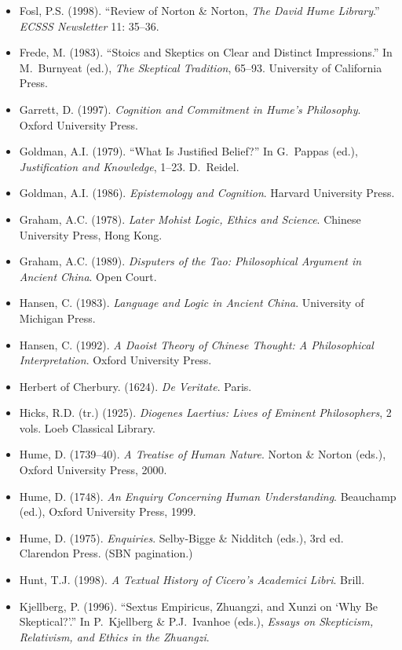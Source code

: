 \documentclass[11pt]{article}
\theoremstyle{plain}
\theoremstyle{definition}
\theoremstyle{remark}
\begin{document}
\begin{itemize}
{Recovery of Pyrrhonism}. American Classical Studies 46. Oxford
University Press.
\item Fosl, P.S. (1998). ``Review of Norton \& Norton, \emph{The David
Hume Library}.'' \emph{ECSSS Newsletter} 11: 35--36.
\item Frede, M. (1983). ``Stoics and Skeptics on Clear and Distinct
Impressions.'' In M.~Burnyeat (ed.), \emph{The Skeptical Tradition},
65--93. University of California Press.
\item Garrett, D. (1997). \emph{Cognition and Commitment in Hume's
Philosophy}. Oxford University Press.
\item Goldman, A.I. (1979). ``What Is Justified Belief?'' In G.~Pappas
(ed.), \emph{Justification and Knowledge}, 1--23. D.~Reidel.
\item Goldman, A.I. (1986). \emph{Epistemology and Cognition}. Harvard
University Press.
\item Graham, A.C. (1978). \emph{Later Mohist Logic, Ethics and
Science}. Chinese University Press, Hong Kong.
\item Graham, A.C. (1989). \emph{Disputers of the Tao: Philosophical
Argument in Ancient China}. Open Court.
\item Hansen, C. (1983). \emph{Language and Logic in Ancient China}.
University of Michigan Press.
\item Hansen, C. (1992). \emph{A Daoist Theory of Chinese Thought: A
Philosophical Interpretation}. Oxford University Press.
\item Herbert of Cherbury. (1624). \emph{De Veritate}. Paris.
\item Hicks, R.D. (tr.) (1925). \emph{Diogenes Laertius: Lives of
Eminent Philosophers}, 2 vols. Loeb Classical Library.
\item Hume, D. (1739--40). \emph{A Treatise of Human Nature}. Norton \&
Norton (eds.), Oxford University Press, 2000.
\item Hume, D. (1748). \emph{An Enquiry Concerning Human Understanding}.
Beauchamp (ed.), Oxford University Press, 1999.
\item Hume, D. (1975). \emph{Enquiries}. Selby-Bigge \& Nidditch
(eds.), 3rd ed. Clarendon Press. (SBN pagination.)
\item Hunt, T.J. (1998). \emph{A Textual History of Cicero's Academici
Libri}. Brill.
\item Kjellberg, P. (1996). ``Sextus Empiricus, Zhuangzi, and Xunzi on
`Why Be Skeptical?'.'' In P.~Kjellberg \& P.J.~Ivanhoe (eds.),
\emph{Essays on Skepticism, Relativism, and Ethics in the Zhuangzi}.

\end{itemize}
\end{document}
